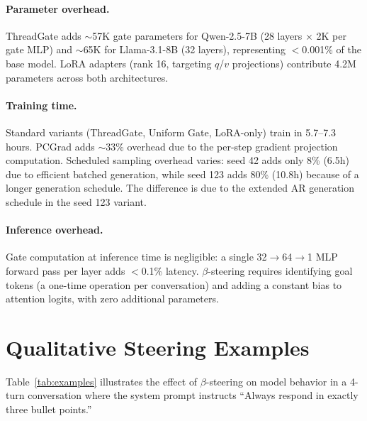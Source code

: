\paragraph{Parameter overhead.} ThreadGate adds ${\sim}$57K gate parameters for Qwen-2.5-7B (28 layers $\times$ 2K per gate MLP) and ${\sim}$65K for Llama-3.1-8B (32 layers), representing $<$0.001\% of the base model. LoRA adapters (rank 16, targeting $q$/$v$ projections) contribute 4.2M parameters across both architectures.

\paragraph{Training time.} Standard variants (ThreadGate, Uniform Gate, LoRA-only) train in 5.7--7.3 hours. PCGrad adds ${\sim}$33\% overhead due to the per-step gradient projection computation. Scheduled sampling overhead varies: seed 42 adds only 8\% (6.5h) due to efficient batched generation, while seed 123 adds 80\% (10.8h) because of a longer generation schedule. The difference is due to the extended AR generation schedule in the seed 123 variant.

\paragraph{Inference overhead.} Gate computation at inference time is negligible: a single 32$\to$64$\to$1 MLP forward pass per layer adds $<$0.1\% latency. $\beta$-steering requires identifying goal tokens (a one-time operation per conversation) and adding a constant bias to attention logits, with zero additional parameters.

\section{Qualitative Steering Examples}\label{sec:appendix-examples}

Table~\ref{tab:examples} illustrates the effect of $\beta$-steering on model behavior in a 4-turn conversation where the system prompt instructs ``Always respond in exactly three bullet points.''

